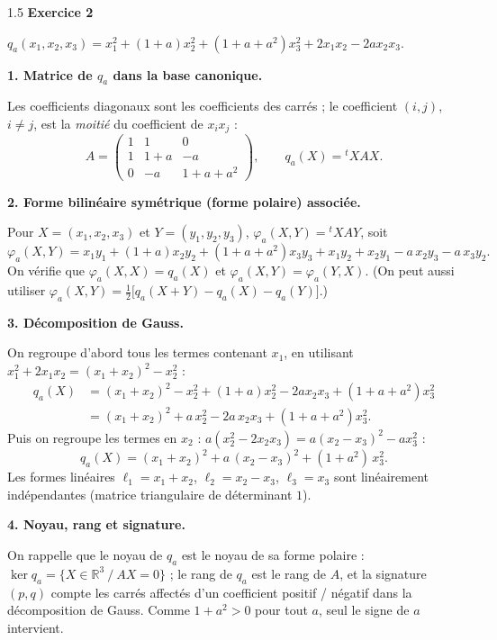 \documentclass[12pt]{article}
\begin{document}
\begin{spacing}{1.5}
\medskip\textbf{Exercice 2}

$q_a(x_1,x_2,x_3)=x_1^2+(1+a)x_2^2+(1+a+a^2)x_3^2+2x_1x_2-2ax_2x_3$.

\textbf{1. Matrice de $q_a$ dans la base canonique.}

Les coefficients diagonaux sont les coefficients des carrés ; le coefficient $(i,j)$, $i\neq j$, est la \emph{moitié} du coefficient de $x_ix_j$ :
\[
A=\begin{pmatrix}
1 & 1 & 0 \\
1 & 1+a & -a \\
0 & -a & 1+a+a^2
\end{pmatrix},\qquad q_a(X)={}^tXAX .
\]

\textbf{2. Forme bilinéaire symétrique (forme polaire) associée.}

Pour $X=(x_1,x_2,x_3)$ et $Y=(y_1,y_2,y_3)$, $\varphi_a(X,Y)={}^tXAY$, soit
\[
\varphi_a(X,Y)=x_1y_1+(1+a)x_2y_2+(1+a+a^2)x_3y_3+x_1y_2+x_2y_1-a\,x_2y_3-a\,x_3y_2 .
\]
On vérifie que $\varphi_a(X,X)=q_a(X)$ et $\varphi_a(X,Y)=\varphi_a(Y,X)$. (On peut aussi utiliser $\varphi_a(X,Y)=\frac12\big[q_a(X+Y)-q_a(X)-q_a(Y)\big]$.)

\textbf{3. Décomposition de Gauss.}

On regroupe d'abord tous les termes contenant $x_1$, en utilisant $x_1^2+2x_1x_2=(x_1+x_2)^2-x_2^2$ :
\begin{align*}
q_a(X)&=(x_1+x_2)^2-x_2^2+(1+a)x_2^2-2ax_2x_3+(1+a+a^2)x_3^2\\
&=(x_1+x_2)^2+a\,x_2^2-2a\,x_2x_3+(1+a+a^2)x_3^2 .
\end{align*}
Puis on regroupe les termes en $x_2$ : $a(x_2^2-2x_2x_3)=a(x_2-x_3)^2-ax_3^2$ :
\[
\boxed{q_a(X)=(x_1+x_2)^2+a\,(x_2-x_3)^2+(1+a^2)\,x_3^2}.
\]
Les formes linéaires $\ell_1=x_1+x_2$, $\ell_2=x_2-x_3$, $\ell_3=x_3$ sont linéairement indépendantes (matrice triangulaire de déterminant $1$).

\textbf{4. Noyau, rang et signature.}

On rappelle que le noyau de $q_a$ est le noyau de sa forme polaire : $\ker q_a=\{X\in\mathbb{R}^3 \ /\ AX=0\}$ ; le rang de $q_a$ est le rang de $A$, et la signature $(p,q)$ compte les carrés affectés d'un coefficient positif / négatif dans la décomposition de Gauss. Comme $1+a^2>0$ pour tout $a$, seul le signe de $a$ intervient.


\end{spacing}
\end{document}
